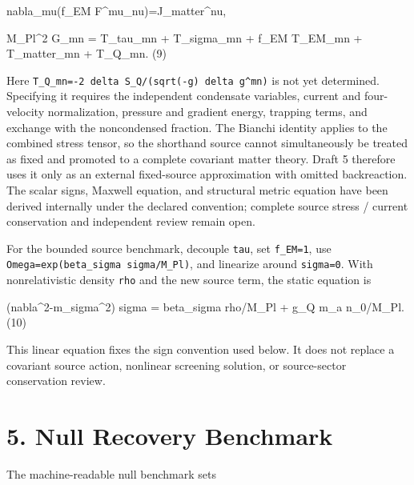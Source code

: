 \documentclass[
  american,
  11pt,
  letterpaper,
]{article}
\newenvironment{Shaded}{}{}
\newcommand{\NormalTok}[1]{#1}
\begin{document}
\begin{Shaded}
\begin{Highlighting}[]
\NormalTok{nabla\_mu(f\_EM F\^{}mu\_nu)=J\_matter\^{}nu,}

\NormalTok{M\_Pl\^{}2 G\_mn = T\_tau\_mn + T\_sigma\_mn + f\_EM T\_EM\_mn}
\NormalTok{              + T\_matter\_mn + T\_Q\_mn.                           (9)}
\end{Highlighting}
\end{Shaded}

Here \texttt{T\_Q\_mn=-2\ delta\ S\_Q/(sqrt(-g)\ delta\ g\^{}mn)} is not yet determined. Specifying it requires the independent condensate variables, current and four-velocity normalization, pressure and gradient energy, trapping terms, and exchange with the noncondensed fraction. The Bianchi identity applies to the combined stress tensor, so the shorthand source cannot simultaneously be treated as fixed and promoted to a complete covariant matter theory. Draft 5 therefore uses it only as an external fixed-source approximation with omitted backreaction. The scalar signs, Maxwell equation, and structural metric equation have been derived internally under the declared convention; complete source stress / current conservation and independent review remain open.

For the bounded source benchmark, decouple \texttt{tau}, set \texttt{f\_EM=1}, use \texttt{Omega=exp(beta\_sigma\ sigma/M\_Pl)}, and linearize around \texttt{sigma=0}. With nonrelativistic density \texttt{rho} and the new source term, the static equation is

\begin{Shaded}
\begin{Highlighting}[]
\NormalTok{(nabla\^{}2{-}m\_sigma\^{}2) sigma}
\NormalTok{  = beta\_sigma rho/M\_Pl + g\_Q m\_a n\_0/M\_Pl.                    (10)}
\end{Highlighting}
\end{Shaded}

This linear equation fixes the sign convention used below. It does not replace a covariant source action, nonlinear screening solution, or source-sector conservation review.

\newpage

\section{5. Null Recovery Benchmark}\label{null-recovery-benchmark}

The machine-readable null benchmark sets
\end{document}
